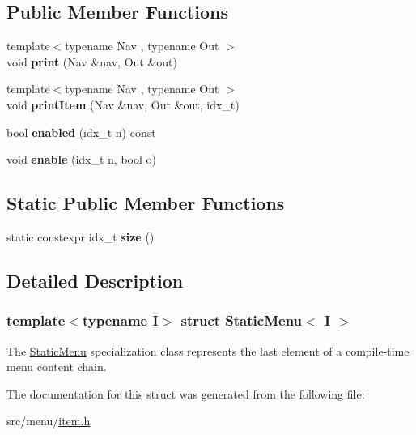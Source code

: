\subsection*{Public Member Functions}
\begin{DoxyCompactItemize}
\item 
\mbox{\label{structStaticMenu_3_01I_01_4_a4449b1842a30593dc7236d44be58651b}} 
{\footnotesize template$<$typename Nav , typename Out $>$ }\\void {\bfseries print} (Nav \&nav, Out \&out)
\item 
\mbox{\label{structStaticMenu_3_01I_01_4_a67a791084edf441d625a12fe7d649392}} 
{\footnotesize template$<$typename Nav , typename Out $>$ }\\void {\bfseries print\+Item} (Nav \&nav, Out \&out, idx\+\_\+t)
\item 
\mbox{\label{structStaticMenu_3_01I_01_4_ae67af5d6b2cc7630b7ab12e2e1bc4dd1}} 
bool {\bfseries enabled} (idx\+\_\+t n) const
\item 
\mbox{\label{structStaticMenu_3_01I_01_4_afa003d349bc90ab91e5f94d44593879c}} 
void {\bfseries enable} (idx\+\_\+t n, bool o)
\end{DoxyCompactItemize}
\subsection*{Static Public Member Functions}
\begin{DoxyCompactItemize}
\item 
\mbox{\label{structStaticMenu_3_01I_01_4_a070f528540a846fa3280e7827b9de47a}} 
static constexpr idx\+\_\+t {\bfseries size} ()
\end{DoxyCompactItemize}


\subsection{Detailed Description}
\subsubsection*{template$<$typename I$>$\newline
struct Static\+Menu$<$ I $>$}

The \hyperlink{classStaticMenu}{Static\+Menu} specialization class represents the last element of a compile-\/time menu content chain. 

The documentation for this struct was generated from the following file\+:\begin{DoxyCompactItemize}
\item 
src/menu/\hyperlink{item_8h}{item.\+h}\end{DoxyCompactItemize}
